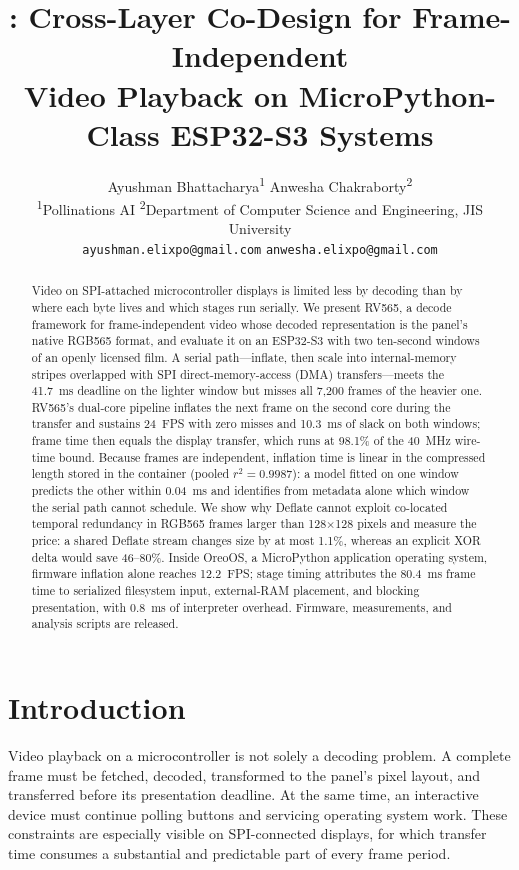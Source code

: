 \documentclass[11pt,twocolumn]{article}
\title{\system: Cross-Layer Co-Design for Frame-Independent\\
Video Playback on MicroPython-Class ESP32-S3 Systems}
\author{Ayushman Bhattacharya\textsuperscript{1} \quad
Anwesha Chakraborty\textsuperscript{2}\\[-0.15em]
{\small \textsuperscript{1}Pollinations AI \quad
\textsuperscript{2}Department of Computer Science and Engineering, JIS University}\\[-0.15em]
{\scriptsize \texttt{ayushman.elixpo@gmail.com} \quad
\texttt{anwesha.elixpo@gmail.com}}}
\date{}
\newcommand{\system}{RV565}
\begin{document}
\maketitle

\begin{abstract}
Video on SPI-attached microcontroller displays is limited less by decoding
than by where each byte lives and which stages run serially.  We present
\system, a decode framework for frame-independent video whose decoded
representation is the panel's native RGB565 format, and evaluate it on an
ESP32-S3 with two ten-second windows of an openly licensed film.  A serial
path---inflate, then scale into internal-memory stripes overlapped with SPI
direct-memory-access (DMA) transfers---meets the 41.7~ms deadline on the
lighter window but misses all 7,200 frames of the heavier one.  \system's
dual-core pipeline inflates the next frame on the second core during the
transfer and sustains 24~FPS with zero misses and 10.3~ms of slack on both
windows; frame time then equals the display transfer, which runs at 98.1\% of
the 40~MHz wire-time bound.  Because frames are independent, inflation time
is linear in the compressed length stored in the container (pooled
$r^2=0.9987$): a model fitted on one window predicts the other within
0.04~ms and identifies from metadata alone which window the serial path
cannot schedule.  We show why Deflate cannot exploit co-located temporal
redundancy in RGB565 frames larger than 128$\times$128 pixels and measure the
price: a shared Deflate stream changes size by at most 1.1\%, whereas an
explicit XOR delta would save 46--80\%.  Inside OreoOS, a MicroPython
application operating system, firmware inflation alone reaches 12.2~FPS;
stage timing attributes the 80.4~ms frame time to serialized filesystem
input, external-RAM placement, and blocking presentation, with 0.8~ms of
interpreter overhead.  Firmware, measurements, and analysis scripts are
released.
\end{abstract}

\section{Introduction}

Video playback on a microcontroller is not solely a decoding problem.  A
complete frame must be fetched, decoded, transformed to the panel's pixel
layout, and transferred before its presentation deadline.  At the same time,
an interactive device must continue polling buttons and servicing operating
system work.  These constraints are especially visible on SPI-connected
displays, for which transfer time consumes a substantial and predictable part
of every frame period.
\end{document}
